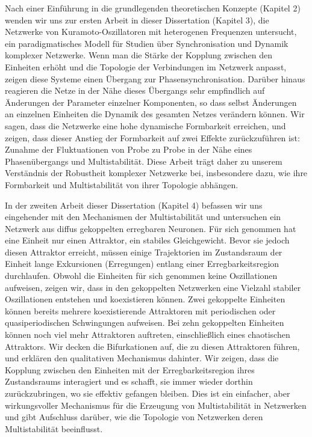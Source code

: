 Nach einer Einführung in die grundlegenden theoretischen Konzepte (Kapitel 2) wenden wir uns zur ersten Arbeit in dieser Dissertation (Kapitel 3), die Netzwerke von Kuramoto-Oszillatoren mit heterogenen Frequenzen untersucht, ein paradigmatisches Modell für Studien über Synchronisation und Dynamik komplexer Netzwerke. Wenn man die Stärke der Kopplung zwischen den Einheiten erhöht und die Topologie der Verbindungen im Netzwerk anpasst, zeigen diese Systeme einen Übergang zur Phasensynchronisation. Darüber hinaus reagieren die Netze in der Nähe dieses Übergangs sehr empfindlich auf Änderungen der Parameter einzelner Komponenten, so dass selbst Änderungen an einzelnen Einheiten die Dynamik des gesamten Netzes verändern können. Wir sagen, dass die Netzwerke eine hohe dynamische Formbarkeit erreichen, und zeigen, dass dieser Anstieg der Formbarkeit auf zwei Effekte zurückzuführen ist: Zunahme der Fluktuationen von Probe zu Probe in der Nähe eines Phasenübergangs und Multistabilität. Diese Arbeit trägt daher zu unserem Verständnis der Robustheit komplexer Netzwerke bei, insbesondere dazu, wie ihre Formbarkeit und Multistabilität von ihrer Topologie abhängen. 

In der zweiten Arbeit dieser Dissertation (Kapitel 4) befassen wir uns eingehender mit den Mechanismen der Multistabilität und untersuchen ein Netzwerk aus diffus gekoppelten erregbaren Neuronen. Für sich genommen hat eine Einheit nur einen Attraktor, ein stabiles Gleichgewicht. Bevor sie jedoch diesen Attraktor erreicht, müssen einige Trajektorien im Zustandsraum der Einheit lange Exkursionen (Erregungen) entlang einer Erregbarkeitsregion durchlaufen. Obwohl die Einheiten für sich genommen keine Oszillationen aufweisen, zeigen wir, dass in den gekoppelten Netzwerken eine Vielzahl stabiler Oszillationen entstehen und koexistieren können. Zwei gekoppelte Einheiten können bereits mehrere koexistierende Attraktoren mit periodischen oder quasiperiodischen Schwingungen aufweisen. Bei zehn gekoppelten Einheiten können noch viel mehr Attraktoren auftreten, einschließlich eines chaotischen Attraktors. Wir decken die Bifurkationen auf, die zu diesen Attraktoren führen, und erklären den qualitativen Mechanismus dahinter. Wir zeigen, dass die Kopplung zwischen den Einheiten mit der Erregbarkeitsregion ihres Zustandsraums interagiert und es schafft, sie immer wieder dorthin zurückzubringen, wo sie effektiv gefangen bleiben. Dies ist ein einfacher, aber wirkungsvoller Mechanismus für die Erzeugung von Multistabilität in Netzwerken und gibt Aufschluss darüber, wie die Topologie von Netzwerken deren Multistabilität beeinflusst. 

